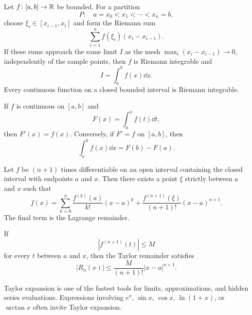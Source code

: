     \begin{definition}
        Let $f\colon [a,b]\to\mathbb{R}$ be bounded. For a partition
        \[
            P:\quad a=x_0<x_1<\cdots<x_n=b,
        \]
        choose $\xi_i\in[x_{i-1},x_i]$ and form the Riemann sum
        \[
            \sum_{i=1}^{n}f(\xi_i)(x_i-x_{i-1}).
        \]
        If these sums approach the same limit $I$ as the mesh
        $\max_i(x_i-x_{i-1})\to0$, independently of the sample points, then
        $f$ is Riemann integrable and
        \[
            I=\int_a^b f(x)\dd x.
        \]
        Every continuous function on a closed bounded interval is Riemann
        integrable.
    \end{definition}

    \begin{theorem}
        If $f$ is continuous on $[a,b]$ and
        \[
            F(x)=\int_a^x f(t)\dd t,
        \]
        then $F'(x)=f(x)$. Conversely, if $F'=f$ on $[a,b]$, then
        \[
            \int_a^b f(x)\dd x=F(b)-F(a).
        \]
    \end{theorem}

    \begin{theorem}
        Let $f$ be $(n+1)$ times differentiable on an open interval containing
        the closed interval with endpoints $a$ and $x$. Then there exists a
        point $\xi$ strictly between $a$ and $x$ such that
        \[
            f(x)
            =
            \sum_{k=0}^{n}\frac{f^{(k)}(a)}{k!}(x-a)^k
            +
            \frac{f^{(n+1)}(\xi)}{(n+1)!}(x-a)^{n+1}.
        \]
        The final term is the Lagrange remainder.
    \end{theorem}

    \begin{corollary}
        If
        \[
            |f^{(n+1)}(t)|\leq M
        \]
        for every $t$ between $a$ and $x$, then the Taylor remainder satisfies
        \[
            |R_n(x)|
            \leq
            \frac{M}{(n+1)!}|x-a|^{n+1}.
        \]
    \end{corollary}

    \begin{strategy}
        Taylor expansion is one of the fastest tools for limits, approximations,
        and hidden series evaluations. Expressions involving $e^x$, $\sin x$,
        $\cos x$, $\ln(1+x)$, or $\arctan x$ often invite Taylor expansion.
    \end{strategy}

